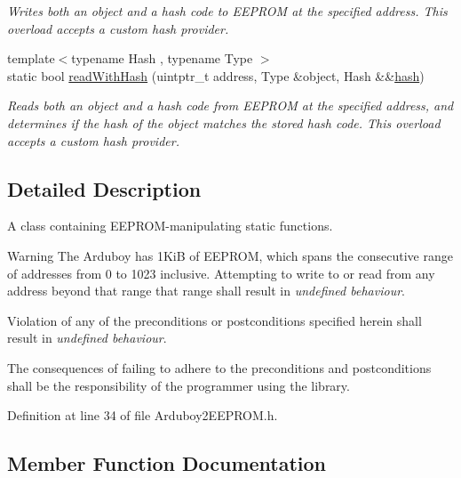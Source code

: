 \begin{DoxyCompactItemize}
\begin{DoxyCompactList}\small\item\em Writes both an object and a hash code to E\+E\+P\+R\+OM at the specified address. This overload accepts a custom hash provider. \end{DoxyCompactList}\item 
{\footnotesize template$<$typename Hash , typename Type $>$ }\\static bool \mbox{\hyperlink{classArduboy2EEPROM_a6b0ef10b0c2f082b2c55a6e002802512}{read\+With\+Hash}} (uintptr\+\_\+t address, Type \&object, Hash \&\&\mbox{\hyperlink{classArduboy2EEPROM_a03bad380b02c4aa613f5a84b7e2712b6}{hash}})
\begin{DoxyCompactList}\small\item\em Reads both an object and a hash code from E\+E\+P\+R\+OM at the specified address, and determines if the hash of the object matches the stored hash code. This overload accepts a custom hash provider. \end{DoxyCompactList}\end{DoxyCompactItemize}


\subsection{Detailed Description}
A {\ttfamily class} containing E\+E\+P\+R\+O\+M-\/manipulating {\ttfamily static} functions. 

\begin{DoxyWarning}{Warning}
The Arduboy has 1KiB of E\+E\+P\+R\+OM, which spans the consecutive range of addresses from 0 to 1023 inclusive. Attempting to write to or read from any address beyond that range that range shall result in {\itshape undefined behaviour}.

Violation of any of the preconditions or postconditions specified herein shall result in {\itshape undefined behaviour}.

The consequences of failing to adhere to the preconditions and postconditions shall be the responsibility of the programmer using the library. 
\end{DoxyWarning}


Definition at line 34 of file Arduboy2\+E\+E\+P\+R\+O\+M.\+h.



\subsection{Member Function Documentation}
\mbox{\label{classArduboy2EEPROM_a4d482ef8e8204c56a0feba68791bc0c8}} 
